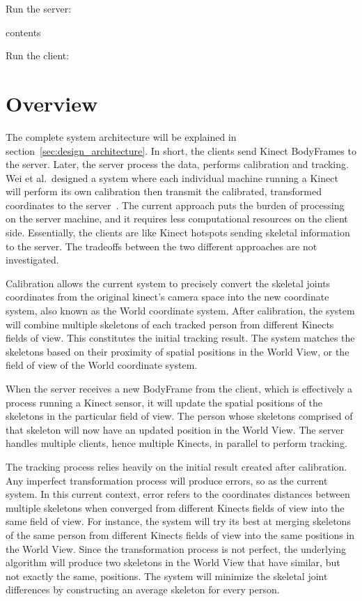 Run the server:

{\centering
  contents\par
}

Run the client:



\section{Overview}
\label{sec:current_approach_overview}

The complete system architecture will be explained in section~\ref{sec:design_architecture}. In short, the clients send Kinect BodyFrames to the server. Later, the server process the data, performs calibration and tracking. Wei et al.\ designed a system where each individual machine running a Kinect will perform its own calibration then transmit the calibrated, transformed coordinates to the server~\cite{wei_kinect_calibration}. The current approach puts the burden of processing on the server machine, and it requires less computational resources on the client side. Essentially, the clients are like Kinect hotspots sending skeletal information to the server. The tradeoffs between the two different approaches are not investigated.

Calibration allows the current system to precisely convert the skeletal joints coordinates from the original kinect's camera space into the new coordinate system, also known as the World coordinate system. After calibration, the system will combine multiple skeletons of each tracked person from different Kinects fields of view. This constitutes the initial tracking result. The system matches the skeletons based on their proximity of spatial positions in the World View, or the field of view of the World coordinate system.

When the server receives a new BodyFrame from the client, which is effectively a process running a Kinect sensor, it will update the spatial positions of the skeletons in the particular field of view. The person whose skeletons comprised of that skeleton will now have an updated position in the World View. The server handles multiple clients, hence multiple Kinects, in parallel to perform tracking.

The tracking process relies heavily on the initial result created after calibration. Any imperfect transformation process will produce errors, so as the current system. In this current context, error refers to the coordinates distances between multiple skeletons when converged from different Kinects fields of view into the same field of view. For instance, the system will try its best at merging skeletons of the same person from different Kinects fields of view into the same positions in the World View. Since the transformation process is not perfect, the underlying algorithm will produce two skeletons in the World View that have similar, but not exactly the same, positions. The system will minimize the skeletal joint differences by constructing an average skeleton for every person.

